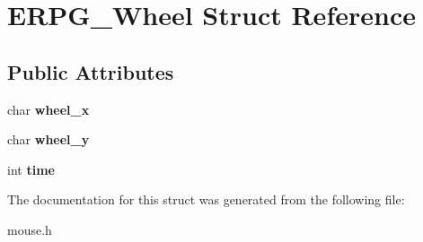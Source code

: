 \hypertarget{structERPG__Wheel}{\section{E\-R\-P\-G\-\_\-\-Wheel Struct Reference}
\label{structERPG__Wheel}
}
\subsection*{Public Attributes}
\begin{DoxyCompactItemize}
\item 
\hypertarget{structERPG__Wheel_a3e5d67c242a8b81dabb6ba2f03d3368a}{char {\bfseries wheel\-\_\-x}}\label{structERPG__Wheel_a3e5d67c242a8b81dabb6ba2f03d3368a}

\item 
\hypertarget{structERPG__Wheel_a12b11e229ea69235b8668b6d8afc637b}{char {\bfseries wheel\-\_\-y}}\label{structERPG__Wheel_a12b11e229ea69235b8668b6d8afc637b}

\item 
\hypertarget{structERPG__Wheel_a4f08a36f4e5818e697d7249b82a64d65}{int {\bfseries time}}\label{structERPG__Wheel_a4f08a36f4e5818e697d7249b82a64d65}

\end{DoxyCompactItemize}


The documentation for this struct was generated from the following file\-:\begin{DoxyCompactItemize}
\item 
mouse.\-h\end{DoxyCompactItemize}
